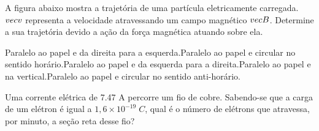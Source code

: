 \documentclass[12pt, addpoints]{exam}
\begin{document}
        \begin{questions}
\begin{multicols*}{2}
\question[20] A ﬁgura abaixo mostra a trajetória de uma partícula eletricamente carregada. $\\vec{{v}}$ representa a velocidade atravessando um campo magnético $\\vec{{B}}$. Determine a sua trajetória devido a ação da força magnética atuando sobre ela.
        
        \begin{center}
            \begin{minipage}[c]{0.5\linewidth}
            \end{minipage}
        \end{center}

        

\begin{choices}
\choice Paralelo ao papel e da direita para a esquerda.\choice Paralelo ao papel e circular no sentido horário.\choice Paralelo ao papel e da esquerda para a direita.\choice Paralelo ao papel e na vertical.\choice Paralelo ao papel e circular no sentido anti-horário.\end{choices}
\question[20] Uma corrente elétrica de    7.47 A percorre um ﬁo de cobre. Sabendo-se que a carga de um elétron é igual a $1,6\times 10^{-19}\;C$, qual é o número de elétrons que atravessa, por minuto, a seção reta desse ﬁo?


\end{multicols*}
\end{questions}
\end{document}

